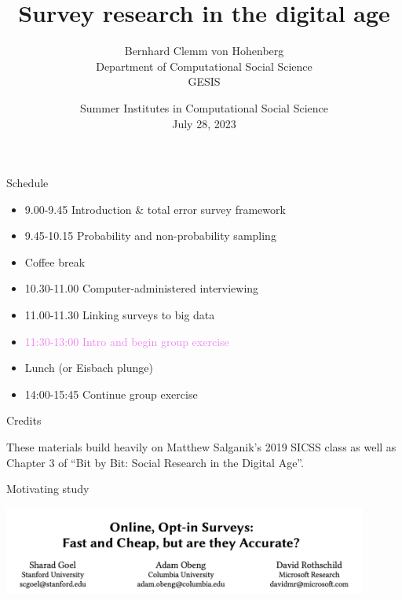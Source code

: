 \documentclass[aspectratio=169]{beamer}
\title[]{Survey research in the digital age}
\author[]{Bernhard Clemm von Hohenberg\\Department of Computational Social Science\\GESIS}
\date[]{Summer Institutes in Computational Social Science\\July 28, 2023}
\begin{document}
\frame{\titlepage}

\begin{frame}{Schedule}

\vspace{0.5em}
\begin{itemize}
\item 9.00-9.45 Introduction \& total error survey framework
\item 9.45-10.15 Probability and non-probability sampling
\vspace{0.5em}
\item Coffee break
\vspace{0.5em}
\item 10.30-11.00 Computer-administered interviewing
\item 11.00-11.30 Linking surveys to big data
\item \textcolor{violet}{11:30-13:00 Intro and begin group exercise}
\vspace{0.5em}
\item Lunch (or Eisbach plunge)
\vspace{0.5em}
\item 14:00-15:45 Continue group exercise
\end{itemize}

\end{frame}
\begin{frame}{Credits}

These materials build heavily on Matthew Salganik's 2019 SICSS class as well as Chapter 3 of ``Bit by Bit: Social Research in the Digital Age''.

\end{frame}
\begin{frame}{Motivating study}

\begin{center}
\includegraphics[width=0.9\textwidth]{figures/goel_online_2017_title}
\end{center}
\vfill
{}

\end{frame}
\end{document}
